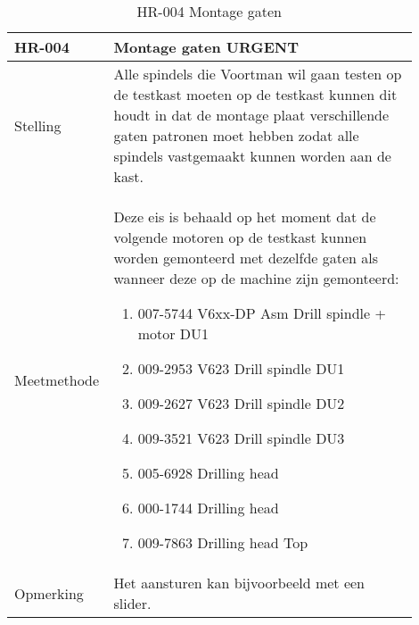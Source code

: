\newpage

\begin{table}[ht]
	\caption{HR-004 Montage gaten}
	\label{tab:HR-004}
	\centering
	\begin{tabular}{|p{0.15\linewidth}|p{0.75\linewidth}|}
		\hline
		HR-004 & Montage gaten URGENT \\
		
		\hline
		
		Stelling & Alle spindels die Voortman wil gaan testen op de testkast moeten op de testkast kunnen dit houdt in dat de montage plaat verschillende gaten patronen moet hebben zodat alle spindels vastgemaakt kunnen worden aan de kast. \\
		
		Meetmethode & Deze eis is behaald op het moment dat de volgende motoren op de testkast kunnen worden gemonteerd met dezelfde gaten als wanneer deze op de machine zijn gemonteerd:
		\begin{enumerate}
			\item 007-5744 V6xx-DP Asm Drill spindle + motor DU1
			\item 009-2953 V623 Drill spindle DU1
			\item 009-2627 V623 Drill spindle DU2
			\item 009-3521 V623 Drill spindle DU3
			\item 005-6928 Drilling head
			\item 000-1744 Drilling head
			\item 009-7863 Drilling head Top
		\end{enumerate} \\
		
		Opmerking & Het aansturen kan bijvoorbeeld met een slider. \\
		\hline
	\end{tabular}
\end{table}


